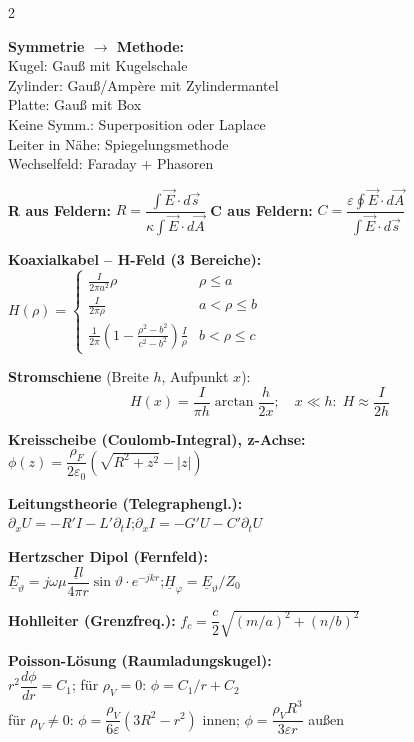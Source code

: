 \documentclass[a4paper, 7.5pt]{extarticle}
\begin{document}
\begin{multicols*}{2}
\begin{tcolorbox}[title={Analogietabelle + Lösungsstrategien}, colback=white, colframe=boxtitle]
\textbf{Symmetrie $\to$ Methode:}\\
Kugel: Gauß mit Kugelschale\\
Zylinder: Gauß/Ampère mit Zylindermantel\\
Platte: Gauß mit Box\\
Keine Symm.: Superposition oder Laplace\\
Leiter in Nähe: Spiegelungsmethode\\
Wechselfeld: Faraday + Phasoren

\textbf{R aus Feldern:} $R=\dfrac{\int\vec{E}\cdot d\vec{s}}{\kappa\int\vec{E}\cdot d\vec{A}}$\quad
\textbf{C aus Feldern:} $C=\dfrac{\varepsilon\oint\vec{E}\cdot d\vec{A}}{\int\vec{E}\cdot d\vec{s}}$
\end{tcolorbox}

\begin{tcolorbox}[title={Weitere Körper}, colback=white, colframe=boxtitle]
\textbf{Koaxialkabel – H-Feld (3 Bereiche):}\\
$H(\rho)=\begin{cases}\tfrac{I}{2\pi a^2}\rho & \rho\leq a\\[2pt]\tfrac{I}{2\pi\rho} & a<\rho\leq b\\[2pt]\tfrac{1}{2\pi}\!\left(1-\tfrac{\rho^2-b^2}{c^2-b^2}\right)\tfrac{I}{\rho} & b<\rho\leq c\end{cases}$

\textbf{Stromschiene} (Breite $h$, Aufpunkt $x$):
\[H(x)=\frac{I}{\pi h}\arctan\!\frac{h}{2x};\quad x\ll h:\; H\approx\frac{I}{2h}\]

\textbf{Kreisscheibe (Coulomb-Integral), z-Achse:}\\
$\phi(z)=\dfrac{\rho_F}{2\varepsilon_0}(\sqrt{R^2+z^2}-|z|)$

\textbf{Leitungstheorie (Telegraphengl.):}\\
$\partial_x U=-R'I-L'\partial_t I$;\quad $\partial_x I=-G'U-C'\partial_t U$

\textbf{Hertzscher Dipol (Fernfeld):}\\
$\underline{E}_\vartheta=j\omega\mu\dfrac{\underline{I}l}{4\pi r}\sin\vartheta\cdot e^{-jkr}$;\quad $\underline{H}_\varphi=\underline{E}_\vartheta/Z_0$

\textbf{Hohlleiter (Grenzfreq.):} $f_c=\dfrac{c}{2}\sqrt{(m/a)^2+(n/b)^2}$

\textbf{Poisson-Lösung (Raumladungskugel):}\\
$r^2\dfrac{d\phi}{dr}=C_1$;\; für $\rho_V=0$: $\phi=C_1/r+C_2$\\
für $\rho_V\neq0$: $\phi=\dfrac{\rho_V}{6\varepsilon}(3R^2-r^2)$ innen;\; $\phi=\dfrac{\rho_V R^3}{3\varepsilon r}$ außen


\end{tcolorbox}
\end{multicols*}
\end{document}
